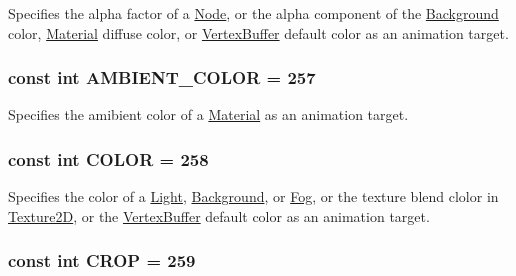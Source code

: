 Specifies the alpha factor of a \hyperlink{classm3g_1_1Node}{Node}, or the alpha component of the \hyperlink{classm3g_1_1Background}{Background} color, \hyperlink{classm3g_1_1Material}{Material} diffuse color, or \hyperlink{classm3g_1_1VertexBuffer}{VertexBuffer} default color as an animation target. \hypertarget{classm3g_1_1AnimationTrack_71b6e9c23b95f8011da4565f4a12f677}{
\subsubsection[{AMBIENT\_\-COLOR}]{\setlength{\rightskip}{0pt plus 5cm}const int {\bf AMBIENT\_\-COLOR} = 257}}
\label{classm3g_1_1AnimationTrack_71b6e9c23b95f8011da4565f4a12f677}


Specifies the amibient color of a \hyperlink{classm3g_1_1Material}{Material} as an animation target. \hypertarget{classm3g_1_1AnimationTrack_a6d8034c897057de595a4511a4e7a837}{
\subsubsection[{COLOR}]{\setlength{\rightskip}{0pt plus 5cm}const int {\bf COLOR} = 258}}
\label{classm3g_1_1AnimationTrack_a6d8034c897057de595a4511a4e7a837}


Specifies the color of a \hyperlink{classm3g_1_1Light}{Light}, \hyperlink{classm3g_1_1Background}{Background}, or \hyperlink{classm3g_1_1Fog}{Fog}, or the texture blend clolor in \hyperlink{classm3g_1_1Texture2D}{Texture2D}, or the \hyperlink{classm3g_1_1VertexBuffer}{VertexBuffer} default color as an animation target. \hypertarget{classm3g_1_1AnimationTrack_91fa562078e577c24d06faf8391b34fe}{
\subsubsection[{CROP}]{\setlength{\rightskip}{0pt plus 5cm}const int {\bf CROP} = 259}}
\label{classm3g_1_1AnimationTrack_91fa562078e577c24d06faf8391b34fe}


